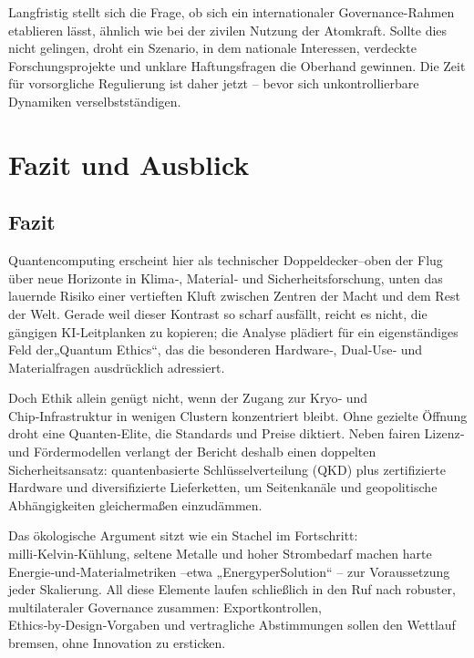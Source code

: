 Langfristig stellt sich die Frage, ob sich ein internationaler Governance-Rahmen etablieren lässt, ähnlich wie bei der zivilen Nutzung der Atomkraft. Sollte dies nicht gelingen, droht ein Szenario, in dem nationale Interessen, verdeckte Forschungsprojekte und unklare Haftungsfragen die Oberhand gewinnen. Die Zeit für vorsorgliche Regulierung ist daher jetzt – bevor sich unkontrollierbare Dynamiken verselbstständigen.

 


 

 
 

 

\section{Fazit und Ausblick}
\subsection{Fazit}


Quantencomputing erscheint hier als technischer Doppeldecker–oben der Flug über neue Horizonte in Klima‑, Material‑ und Sicherheitsforschung, unten das lauernde Risiko einer vertieften Kluft zwischen Zentren der Macht und dem Rest der Welt. Gerade weil dieser Kontrast so scharf ausfällt, reicht es nicht, die gängigen KI‑Leitplanken zu kopieren; die Analyse plädiert für ein eigenständiges Feld der„Quantum Ethics“, das die besonderen Hardware‑, Dual‑Use‑ und Materialfragen ausdrücklich adressiert.

Doch Ethik allein genügt nicht, wenn der Zugang zur Kryo‑ und Chip‑Infrastruktur in wenigen Clustern konzentriert bleibt. Ohne gezielte Öffnung droht eine Quanten‑Elite, die Standards und Preise diktiert. Neben fairen Lizenz‑ und Fördermodellen verlangt der Bericht deshalb einen doppelten Sicherheitsansatz: quantenbasierte Schlüsselverteilung (QKD) plus zertifizierte Hardware und diversifizierte Lieferketten, um Seitenkanäle und geopolitische Abhängigkeiten gleichermaßen einzudämmen.

Das ökologische Argument sitzt wie ein Stachel im Fortschritt: milli‑Kelvin‑Kühlung, seltene Metalle und hoher Strombedarf machen harte Energie‑und‑Materialmetriken –etwa „EnergyperSolution“ – zur Voraussetzung jeder Skalierung. All diese Elemente laufen schließlich in den Ruf nach robuster, multilateraler Governance zusammen: Exportkontrollen, Ethics‑by‑Design‑Vorgaben und vertragliche Abstimmungen sollen den Wettlauf bremsen, ohne Innovation zu ersticken.

